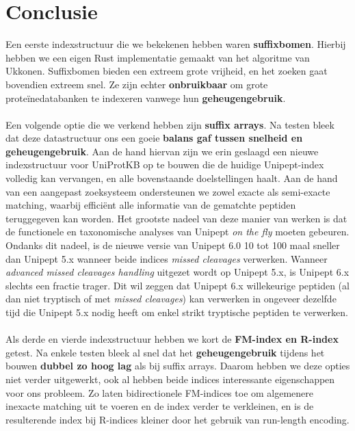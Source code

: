 \section{Conclusie}
Een eerste indexstructuur die we bekekenen hebben waren \textbf{suffixbomen}.
Hierbij hebben we een eigen Rust implementatie gemaakt van het algoritme van Ukkonen.
Suffixbomen bieden een extreem grote vrijheid, en het zoeken gaat bovendien extreem snel.
Ze zijn echter \textbf{onbruikbaar} om grote proteïnedatabanken te indexeren vanwege hun \textbf{geheugengebruik}.
\\ \\
Een volgende optie die we verkend hebben zijn \textbf{suffix arrays}.
Na testen bleek dat deze datastructuur ons een goeie \textbf{balans gaf tussen snelheid en geheugengebruik}.
Aan de hand hiervan zijn we erin geslaagd een nieuwe indexstructuur voor UniProtKB op te bouwen die de huidige Unipept-index volledig kan vervangen, en alle bovenstaande doelstellingen haalt.
Aan de hand van een aangepast zoeksysteem ondersteunen we zowel exacte als semi-exacte matching, waarbij efficiënt alle informatie van de gematchte peptiden teruggegeven kan worden.
Het grootste nadeel van deze manier van werken is dat de functionele en taxonomische analyses van Unipept \textit{on the fly} moeten gebeuren.
Ondanks dit nadeel, is de nieuwe versie van Unipept 6.0 10 tot 100 maal sneller dan Unipept 5.x wanneer beide indices \textit{missed cleavages} verwerken.
Wanneer \textit{advanced missed cleavages handling} uitgezet wordt op Unipept 5.x, is Unipept 6.x slechts een fractie trager.
Dit wil zeggen dat Unipept 6.x willekeurige peptiden (al dan niet tryptisch of met \textit{missed cleavages}) kan verwerken in ongeveer dezelfde tijd die Unipept 5.x nodig heeft om enkel strikt tryptische peptiden te verwerken.
\\ \\
Als derde en vierde indexstructuur hebben we kort de \textbf{FM-index en R-index} getest.
Na enkele testen bleek al snel dat het \textbf{geheugengebruik} tijdens het bouwen \textbf{dubbel zo hoog lag} als bij suffix arrays.
Daarom hebben we deze opties niet verder uitgewerkt, ook al hebben beide indices interessante eigenschappen voor ons probleem.
Zo laten bidirectionele FM-indices toe om algemenere inexacte matching uit te voeren en de index verder te verkleinen, en is de resulterende index bij R-indices kleiner door het gebruik van run-length encoding.

